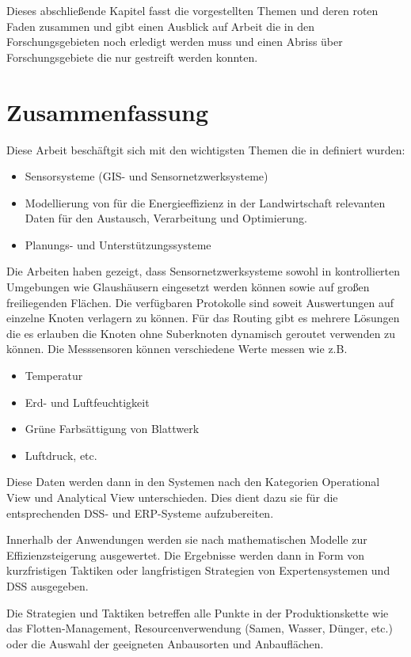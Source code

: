 Dieses abschließende Kapitel fasst die vorgestellten Themen und deren roten Faden zusammen und gibt einen Ausblick auf Arbeit die in den Forschungsgebieten noch erledigt werden muss und einen Abriss über Forschungsgebiete die nur gestreift werden konnten.

\section{Zusammenfassung}
Diese Arbeit beschäftgit sich mit den wichtigsten Themen die in \cite{misc:Mikkola2013} definiert wurden:

\begin{itemize}
	\item Sensorsysteme (GIS- und Sensornetzwerksysteme)
	\item Modellierung von für die Energieeffizienz in der Landwirtschaft relevanten Daten für den Austausch, Verarbeitung und Optimierung.
	\item Planungs- und Unterstützungssysteme 
\end{itemize}

Die Arbeiten haben gezeigt, dass Sensornetzwerksysteme sowohl in kontrollierten Umgebungen wie Glaushäusern eingesetzt werden können sowie auf großen freiliegenden Flächen. Die verfügbaren Protokolle sind soweit Auswertungen auf einzelne Knoten verlagern zu können. Für das Routing gibt es mehrere Lösungen die es erlauben die Knoten ohne Suberknoten dynamisch geroutet verwenden zu können. Die Messsensoren können verschiedene Werte messen wie z.B.

\begin{itemize}
	\item Temperatur
	\item Erd- und Luftfeuchtigkeit
	\item Grüne Farbsättigung von Blattwerk
	\item Luftdruck, etc.
\end{itemize}

Diese Daten werden dann in den Systemen nach den Kategorien Operational View und Analytical View unterschieden. Dies dient dazu sie für die entsprechenden DSS- und ERP-Systeme aufzubereiten.

Innerhalb der Anwendungen werden sie nach mathematischen Modelle zur Effizienzsteigerung ausgewertet. Die Ergebnisse werden dann in Form von kurzfristigen Taktiken oder langfristigen Strategien von Expertensystemen und DSS ausgegeben.

Die Strategien und Taktiken betreffen alle Punkte in der Produktionskette wie das Flotten-Management, Resourcenverwendung (Samen, Wasser, Dünger, etc.) oder die Auswahl der geeigneten Anbausorten und Anbauflächen.

